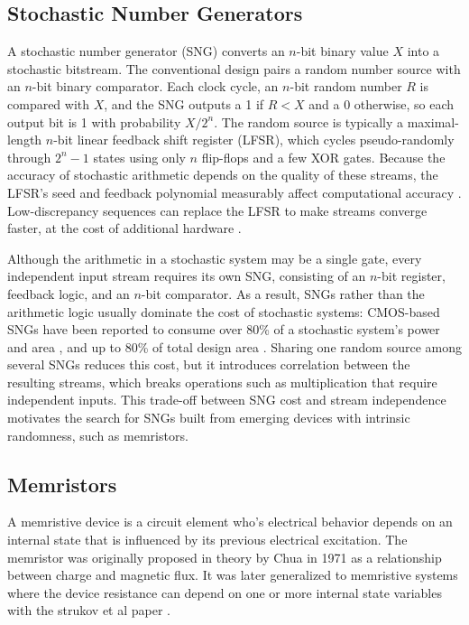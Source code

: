 \documentclass[conference]{IEEEtran}
\begin{document}
\subsection{Stochastic Number Generators}
A stochastic number generator (SNG) converts an $n$-bit binary value $X$ into
a stochastic bitstream. The conventional design pairs a random number source
with an $n$-bit binary comparator. Each clock cycle, an $n$-bit random number
$R$ is compared with $X$, and the SNG outputs a 1 if $R < X$ and a 0
otherwise, so each output bit is 1 with probability $X/2^n$. The random
source is typically a maximal-length $n$-bit linear feedback shift register
(LFSR), which cycles pseudo-randomly through $2^n - 1$ states using only $n$
flip-flops and a few XOR gates. Because the accuracy of stochastic arithmetic
depends on the quality of these streams, the LFSR's seed and feedback
polynomial measurably affect computational accuracy \cite{LFSR_seeding}.
Low-discrepancy sequences can replace the LFSR to make streams converge
faster, at the cost of additional hardware \cite{low_discrepancy}.

Although the arithmetic in a stochastic system may be a single gate, every
independent input stream requires its own SNG, consisting of an $n$-bit
register, feedback logic, and an $n$-bit comparator. As a result, SNGs rather
than the arithmetic logic usually dominate the cost of stochastic systems:
CMOS-based SNGs have been reported to consume over 80\% of a stochastic
system's power and area \cite{sng_cost_reram}, and up to 80\% of total design
area \cite{scrimp}. Sharing one random source among several SNGs reduces this
cost, but it introduces correlation between the resulting streams, which
breaks operations such as multiplication that require independent inputs.
This trade-off between SNG cost and stream independence motivates the search
for SNGs built from emerging devices with intrinsic randomness, such as
memristors.

\subsection{Memristors}

A memristive device is a circuit element who's electrical behavior depends on an 
internal state that is influenced by its previous electrical excitation. The 
memristor was originally proposed in theory by Chua in 1971 \cite{chua1971memristor}
as a relationship between charge and magnetic flux. It was later generalized to 
memristive systems where the device resistance can depend on one or more internal 
state variables with the strukov et al paper \cite{Strukov2008}.
\end{document}
